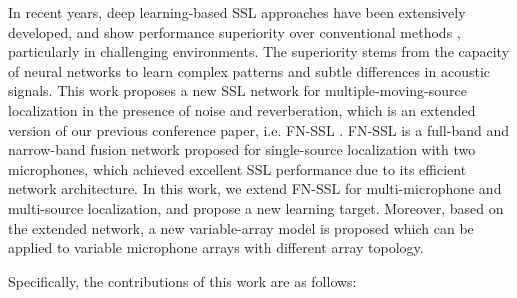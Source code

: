 \documentclass[lettersize,journal]{IEEEtran}
\begin{document}
In recent years, deep learning-based SSL approaches have been extensively developed, and show performance superiority over conventional methods  \cite{grumiaux2022survey, He2021NeuralNA, Grumiaux2021SaladnetSM, yang2021learning,DiazGuerra2020RobustSS,DiazGuerra2022DirectionOA, Fu2022IterativeSS,Yin2022MIMODoAnetMI,Yang2022SRPDNNLD,Kowalk2022GeometryAwareDE,Wang2023FramewiseMS,Cho2023SRSRPSB,WYBIS23}, particularly in challenging environments. 
The superiority stems from the capacity of neural networks to learn complex patterns and subtle differences in acoustic signals. This work proposes a new SSL network for multiple-moving-source localization in the presence of noise and reverberation, which is an extended version of our previous conference paper, i.e. FN-SSL \cite{WYBIS23}. FN-SSL is a full-band and narrow-band fusion network proposed for single-source localization with two microphones, which achieved excellent SSL performance due to its efficient network architecture. In this work, we extend FN-SSL for multi-microphone and multi-source localization, and propose a new learning target. Moreover, based on the extended network, a new variable-array model is proposed which can be applied to variable microphone arrays with different array topology. 


Specifically, the contributions of this work are as follows:
\end{document}
